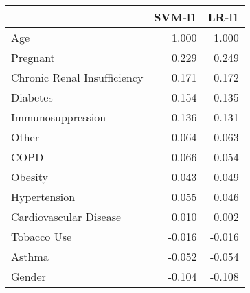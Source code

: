 \begin{tabular}{lrr}
\toprule
{} &  SVM-l1 &  LR-l1 \\
\midrule
Age                         &   1.000 &  1.000 \\
Pregnant                    &   0.229 &  0.249 \\
Chronic Renal Insufficiency &   0.171 &  0.172 \\
Diabetes                    &   0.154 &  0.135 \\
Immunosuppression           &   0.136 &  0.131 \\
Other                       &   0.064 &  0.063 \\
COPD                        &   0.066 &  0.054 \\
Obesity                     &   0.043 &  0.049 \\
Hypertension                &   0.055 &  0.046 \\
Cardiovascular Disease      &   0.010 &  0.002 \\
Tobacco Use                 &  -0.016 & -0.016 \\
Asthma                      &  -0.052 & -0.054 \\
Gender                      &  -0.104 & -0.108 \\
\bottomrule
\end{tabular}
